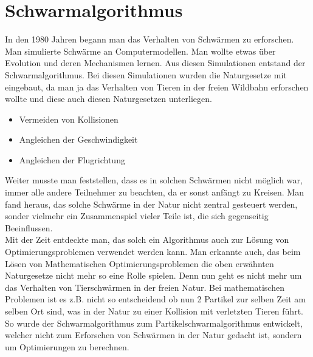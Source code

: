 \section{Schwarmalgorithmus}

In den 1980 Jahren begann man das Verhalten von Schwärmen zu erforschen. Man simulierte Schwärme an Computermodellen. Man wollte etwas über Evolution und deren Mechanismen lernen. Aus diesen Simulationen entstand der Schwarmalgorithmus.
Bei diesen Simulationen wurden die Naturgesetze mit eingebaut, da man ja das Verhalten von Tieren in der freien Wildbahn erforschen wollte und diese auch diesen Naturgesetzen unterliegen.
\begin{itemize}
\item Vermeiden von Kollisionen 
\item Angleichen der Geschwindigkeit
\item Angleichen der Flugrichtung
\end{itemize}

Weiter musste man feststellen, dass es in solchen Schwärmen nicht möglich war, immer alle andere Teilnehmer zu beachten, da er sonst anfängt zu Kreisen. Man fand heraus, das solche Schwärme in der Natur nicht zentral gesteuert werden, sonder vielmehr ein Zusammenspiel vieler Teile ist, die sich gegenseitig Beeinflussen.\\
Mit der Zeit entdeckte man, das solch ein Algorithmus auch zur Lösung von Optimierungsproblemen verwendet werden kann.
Man erkannte auch, das beim Lösen von Mathematischen Optimierungsproblemen die oben erwähnten Naturgesetze nicht mehr so eine Rolle spielen. Denn nun geht es nicht mehr um das Verhalten von Tierschwärmen in der freien Natur. Bei mathematischen Problemen ist es z.B. nicht so entscheidend ob nun 2 Partikel zur selben Zeit am selben Ort sind, was in der Natur zu einer Kollision mit verletzten Tieren führt. So wurde der Schwarmalgorithmus zum Partikelschwarmalgorithmus entwickelt, welcher nicht zum Erforschen von Schwärmen in der Natur gedacht ist, sondern um Optimierungen zu berechnen.